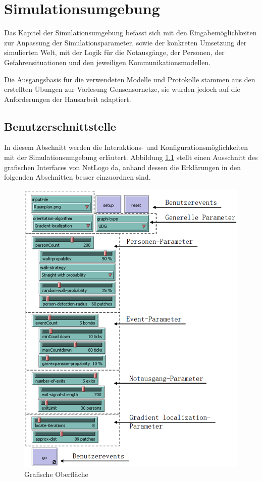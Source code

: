 \chapter{Simulationsumgebung}
\label{cha:simulationsumgebung}

Das Kapitel der Simulationsumgebung befasst sich mit den Eingabemöglichkeiten zur Anpassung der Simulationsparameter, sowie der konkreten Umsetzung der simulierten Welt, mit der Logik für die Notausgänge, der Personen, der Gefahrensituationen und den jeweiligen Kommunikationsmodellen.

Die Ausgangsbasis für die verwendeten Modelle und Protokolle stammen aus den erstellten Übungen zur Vorlesung Gensensornetze, sie wurden jedoch auf die Anforderungen der Hausarbeit adaptiert.




\section{Benutzerschnittstelle}
\label{sec:benutzerschnittstelle}

In diesem Abschnitt werden die Interaktions- und Konfigurationsmöglichkeiten mit der Simulationsumgebung erläutert. Abbildung \ref{fig:gui} stellt einen Ausschnitt des grafischen Interfaces von NetLogo da, anhand dessen die Erklärungen in den folgenden Abschnitten besser einzuordnen sind. 

\begin{figure}[!ht]
\centering
\includegraphics[height=0.85\textwidth]{simulationsumgebung/gui_3}
\caption{Grafische Oberfläche}
\label{fig:gui}
\end{figure}


